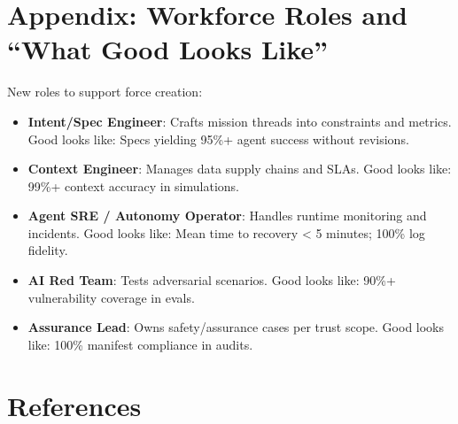 \documentclass[11pt]{article}
\begin{document}
\section{Appendix: Workforce Roles and ``What Good Looks Like''}\label{appendix-workforce-roles-and-what-good-looks-like}

New roles to support force creation:

\begin{itemize}
\item
  \textbf{Intent/Spec Engineer}: Crafts mission threads into constraints and metrics. Good looks like: Specs yielding 95\%+ agent success without revisions.
\item
  \textbf{Context Engineer}: Manages data supply chains and SLAs. Good looks like: 99\%+ context accuracy in simulations.
\item
  \textbf{Agent SRE / Autonomy Operator}: Handles runtime monitoring and incidents. Good looks like: Mean time to recovery \textless{} 5 minutes; 100\% log fidelity.
\item
  \textbf{AI Red Team}: Tests adversarial scenarios. Good looks like: 90\%+ vulnerability coverage in evals.
\item
  \textbf{Assurance Lead}: Owns safety/assurance cases per trust scope. Good looks like: 100\% manifest compliance in audits.
\end{itemize}

\section{References}\label{references}
\end{document}
